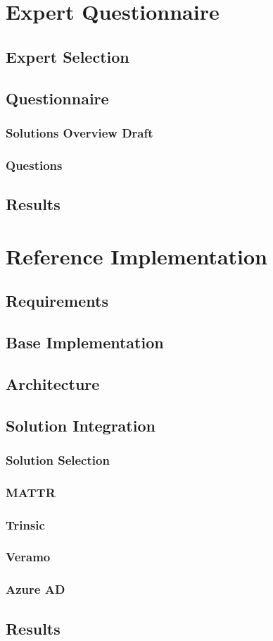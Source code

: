
\chapter{Expert Questionnaire}\label{chapter: expert}

	\section{Expert Selection}
	
	\section{Questionnaire}
	\subsection{Solutions Overview Draft}
	\subsection{Questions}

	\section{Results}
	
	
\chapter{Reference Implementation}\label{chapter: implementation}

    \section{Requirements}
    \section{Base Implementation}
    \section{Architecture}
    \section{Solution Integration}
    \subsection{Solution Selection}
    \subsection{MATTR}
    \subsection{Trinsic}
    \subsection{Veramo}
    \subsection{Azure AD}
    \section{Results}